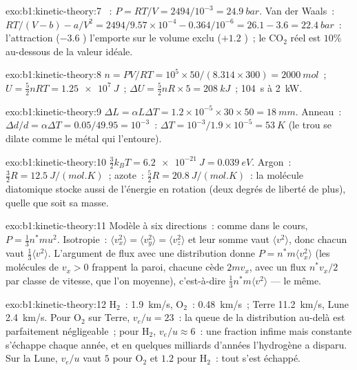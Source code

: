 \begin{solution}{exo:b1:kinetic-theory:7}
~: $P = RT/V = 2494/10^{-3} = \qty{24.9}{bar}$. Van der Waals~:
$RT/(V - b) - a/V^2 = 2494/9.57\times10^{-4} - 0.364/10^{-6} = 26.1 - 3.6 =
\qty{22.4}{bar}$~: l'attraction ($-3.6$ ) l'emporte sur le volume
exclu ($+1.2$ )~; le CO$_2$ réel est $10\%$ au-dessous de la valeur idéale.
\end{solution}

\begin{solution}{exo:b1:kinetic-theory:8}
$n = PV/RT = 10^5 \times 50/(8.314 \times 300) = \qty{2000}{mol}$~; $U = \tfrac52
nRT = \qty{1.25e7}{J}$~; $\Delta U = \tfrac52 nR \times 5 = \qty{208}{kJ}$~;
\qty{104}{s} à \qty{2}{kW}.
\end{solution}

\begin{solution}{exo:b1:kinetic-theory:9}
$\Delta L = \alpha L\Delta T = 1.2\times10^{-5} \times 30 \times 50 = \qty{18}{mm}$.
Anneau~: $\Delta d/d = \alpha\Delta T = 0.05/49.95 = 10^{-3}$~: $\Delta T = 10^{-3}/
1.9\times10^{-5} = \qty{53}{K}$ (le trou se dilate comme le métal qui l'entoure).
\end{solution}

\begin{solution}{exo:b1:kinetic-theory:10}
$\tfrac32 k_BT = \qty{6.2e-21}{J} = \qty{0.039}{eV}$. Argon~: $\tfrac32 R =
\qty{12.5}{J/(mol.K)}$~; azote~: $\tfrac52 R = \qty{20.8}{J/(mol.K)}$~: la
molécule diatomique stocke aussi de l'énergie en rotation (deux degrés de
liberté de plus), quelle que soit sa masse.
\end{solution}

\begin{solution}{exo:b1:kinetic-theory:11}
Modèle à six directions~: comme dans le cours, $P = \tfrac13 n^*mu^2$. Isotropie~:
$\langle v_x^2\rangle = \langle v_y^2\rangle = \langle v_z^2\rangle$ et leur
somme vaut $\langle v^2\rangle$, donc chacun vaut $\tfrac13\langle v^2\rangle$. L'argument
de flux avec une distribution donne $P = n^*m\langle v_x^2\rangle$ (les molécules
de $v_x > 0$ frappent la paroi, chacune cède $2mv_x$, avec un flux $n^*v_x/2$ par
classe de vitesse, que l'on moyenne), c'est-à-dire $\tfrac13 n^*m\langle v^2\rangle$ --- le même.
\end{solution}

\begin{solution}{exo:b1:kinetic-theory:12}
H$_2$~: \qty{1.9}{km/s}, O$_2$~: \qty{0.48}{km/s}~; Terre \qty{11.2}{km/s}, Lune
\qty{2.4}{km/s}. Pour O$_2$ sur Terre, $v_e/u = 23$~: la queue de la
distribution au-delà est parfaitement négligeable~; pour H$_2$, $v_e/u \approx 6$~:
une fraction infime mais constante s'échappe chaque année, et en quelques
milliards d'années l'hydrogène a disparu. Sur la Lune, $v_e/u$ vaut $5$ pour O$_2$ et
$1.2$ pour H$_2$~: tout s'est échappé.
\end{solution}

